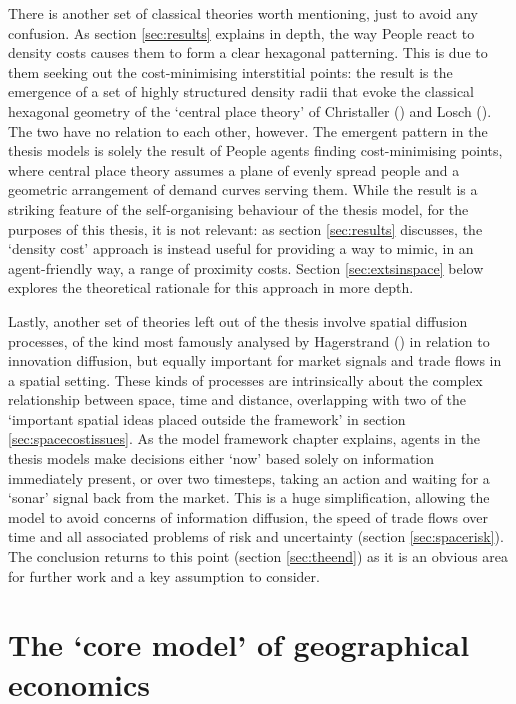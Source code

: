 There is another set of classical theories worth mentioning, just to avoid any confusion. As section \ref{sec:results} explains in depth, the way People react to density costs causes them to form a clear hexagonal patterning. This is due to them seeking out the cost-minimising interstitial points: the result is the emergence of a set of highly structured density radii that evoke the classical hexagonal geometry of the `central place theory' of Christaller (\citealt{christaller_central_1933}) and Losch (\citealt{losch_economics_1940}). The two have no relation to each other, however. The emergent pattern in the thesis models is solely the result of People agents finding cost-minimising points, where central place theory assumes a plane of evenly spread people and a geometric arrangement of demand curves serving them. While the result is a striking feature of the self-organising behaviour of the thesis model, for the purposes of this thesis, it is not relevant: as section \ref{sec:results} discusses, the `density cost' approach is instead useful for providing a way to mimic, in an agent-friendly way, a range of proximity costs. Section \ref{sec:extsinspace} below explores the theoretical rationale for this approach in more depth.

Lastly, another set of theories left out of the thesis involve spatial diffusion processes, of the kind most famously analysed by Hagerstrand (\citeyear{hagerstrand_innovation_1953}) in relation to innovation diffusion, but equally important for market signals and trade flows in a spatial setting. These kinds of processes are intrinsically about the complex relationship between space, time and distance, overlapping with two of the `important spatial ideas placed outside the framework' in section \ref{sec:spacecostissues}. As the model framework chapter explains, agents in the thesis models make decisions either `now' based solely on information immediately present, or over two timesteps, taking an action and waiting for a `sonar' signal back from the market. This is a huge simplification, allowing the model to avoid concerns of information diffusion, the speed of trade flows over time and all associated problems of risk and uncertainty (section \ref{sec:spacerisk}). The conclusion returns to this point (section \ref{sec:theend}) as it is an obvious area for further work and a key assumption to consider.

\section{The `core model' of geographical economics \label{sec:coremodel}}

